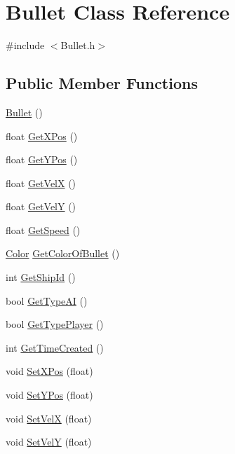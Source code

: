 \hypertarget{classBullet}{\section{Bullet Class Reference}
\label{classBullet}
}


{\ttfamily \#include $<$Bullet.\-h$>$}

\subsection*{Public Member Functions}
\begin{DoxyCompactItemize}
\item 
\hyperlink{classBullet_acd7befc0bc18907cc1d871d37bbdddeb}{Bullet} ()
\item 
float \hyperlink{classBullet_a30ac60a82a7321a0069eeffedf09e433}{Get\-X\-Pos} ()
\item 
float \hyperlink{classBullet_af6882f549d5da6cbbf2a011cfc82bf27}{Get\-Y\-Pos} ()
\item 
float \hyperlink{classBullet_a3cf269950609981f4141a8f75a9c502d}{Get\-Vel\-X} ()
\item 
float \hyperlink{classBullet_a0e16627abb39b15ce067a5437457dd01}{Get\-Vel\-Y} ()
\item 
float \hyperlink{classBullet_a119acf5239e951ee57614e338852848d}{Get\-Speed} ()
\item 
\hyperlink{classColor}{Color} \hyperlink{classBullet_af966bc4a244286b8ef32bbc7721e3139}{Get\-Color\-Of\-Bullet} ()
\item 
int \hyperlink{classBullet_a0d045c9caf0e5e970e26de4f8d9f418a}{Get\-Ship\-Id} ()
\item 
bool \hyperlink{classBullet_afc90a407f6b5fac42312c7ace7163c88}{Get\-Type\-A\-I} ()
\item 
bool \hyperlink{classBullet_a2230bea33068339981834ba0c2899724}{Get\-Type\-Player} ()
\item 
int \hyperlink{classBullet_aa8790a7edbf3a5e5c93873ac447a93f2}{Get\-Time\-Created} ()
\item 
void \hyperlink{classBullet_ad438171251f1fa8041411ca1fc92b167}{Set\-X\-Pos} (float)
\item 
void \hyperlink{classBullet_a2d0a8bed693968075bfd2f39dfc469ce}{Set\-Y\-Pos} (float)
\item 
void \hyperlink{classBullet_aabca1d4041756361b9282ddcf2dc2f9f}{Set\-Vel\-X} (float)
\item 
void \hyperlink{classBullet_a172b0159992b03376caa047b42ab3fc7}{Set\-Vel\-Y} (float)

\end{DoxyCompactItemize}
